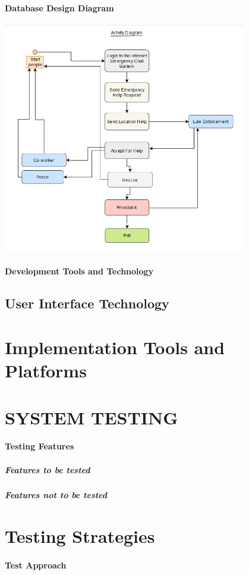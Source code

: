 \documentclass{article}
\begin{document}
\paragraph{Database Design Diagram}
\includegraphics[width=0.8\textwidth]{Activity_Diagram.png}


\paragraph{Development Tools and Technology}
\subsection{User Interface Technology}
\section{Implementation Tools and Platforms}

\newpage
\section{SYSTEM TESTING}
\paragraph{Testing Features}
\subparagraph{Features to be tested}
\subparagraph{Features not to be tested}
\section{Testing Strategies}
\paragraph{Test Approach}
\end{document}
